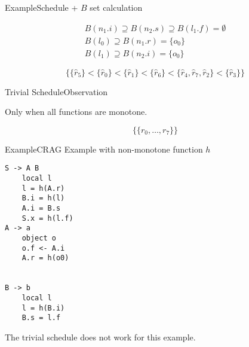 \begin{frame}[fragile=singleslide]{Example}{Schedule + $B$ set calculation}


\begin{equation}
  \begin{gathered}
    B(n_1.i) \supseteq B(n_2.s) \supseteq B(l_1.f) = \emptyset \\
    B(l_0) \supseteq B(n_1.r) = \{ o_0 \}  \\
    B(l_1) \supseteq B(n_2.i) = \{ o_0 \} 
  \end{gathered}
\end{equation}

\begin{equation}
     \Big \{ \{ \hat{r}_5 \} < \{ \hat{r}_0 \} < \{ \hat{r}_1 \} < \{ \hat{r}_6 \} < \{ \hat{r}_4, \hat{r}_7, \hat{r}_2 \} < \{ \hat{r}_3 \}  \Big \}
\end{equation}

\end{frame}

\begin{frame}{Trivial Schedule}{Observation}

Only when \alert{all functions are monotone}. 

$$ \Big\{ \{ r_0, \dots, r_7 \} \Big \}$$

\end{frame}



\begin{frame}[fragile=singleslide]{Example}{CRAG Example with non-monotone function $h$}

\begin{multicols}{3}
\begin{Verbatim}[fontsize=\small]
S -> A B
    local l
    l = h(A.r)
    B.i = h(l)
    A.i = B.s
    S.x = h(l.f)
A -> a
    object o
    o.f <- A.i
    A.r = h(o0)


B -> b
    local l
    l = h(B.i)
    B.s = l.f
\end{Verbatim}
\end{multicols}


\newlinevspace

The trivial schedule \alert{does not work} for this example.

\end{frame}




